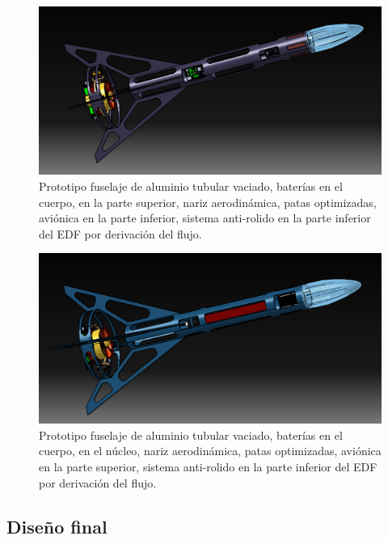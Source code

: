 \begin{figure}[htb]
    \centering
    \includegraphics[width=\linewidth]{fig/design/4}
    \caption{Prototipo fuselaje de aluminio tubular vaciado, baterías en el cuerpo, en la parte superior, nariz
    aerodinámica, patas optimizadas, aviónica en la parte inferior, sistema anti-rolido en la parte
    inferior del EDF por derivación del flujo.}
    \label{fig:design/4}
\end{figure}


\begin{figure}[htb]
    \centering
    \includegraphics[width=\linewidth]{fig/design/5}
    \caption{Prototipo fuselaje de aluminio tubular vaciado, baterías en el cuerpo, en el núcleo, nariz aerodinámica, patas optimizadas, aviónica en la parte superior, sistema anti-rolido en la parte
    inferior del EDF por derivación del flujo.}
    \label{fig:design/5}
\end{figure}

\null\newpage
\clearpage

\subsection{Diseño final}

